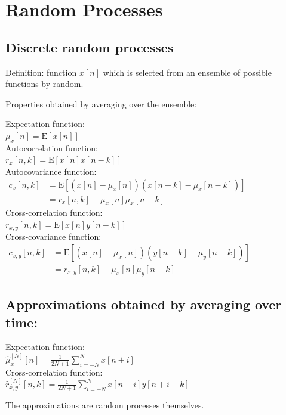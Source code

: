 \documentclass[english]{latex4ei/latex4ei_sheet}
\begin{document}
\section{Random Processes}
\begin{sectionbox}
  \subsection{Discrete random processes}
  Definition: function $x[n]$ which is selected from an ensemble of possible functions by random.
  
  Properties obtained by averaging over the ensemble:
  \begin{emphbox}
    Expectation function:\\
    $\mu_{x}[n]=\mathrm{E}[x[n]]$\\
    Autocorrelation function:\\
    $r_{x}[n, k]=\mathrm{E}[x[n] x[n-k]]$\\
    Autocovariance function:\\
    $\begin{aligned}
      c_{x}[n, k] &=\mathrm{E}\left[\left(x[n]-\mu_{x}[n]\right)\left(x[n-k]-\mu_{x}[n-k]\right)\right] \\
      &=r_{x}[n, k]-\mu_{x}[n] \mu_{x}[n-k]
      \end{aligned}$\\
    Cross-correlation function:\\
    $r_{x, y}[n, k]=\mathrm{E}[x[n] y[n-k]]$\\
    Cross-covariance function:\\
    $\begin{aligned}
      c_{x, y}[n, k] &=\mathrm{E}\left[\left(x[n]-\mu_{x}[n]\right)\left(y[n-k]-\mu_{y}[n-k]\right)\right] \\
      &=r_{x, y}[n, k]-\mu_{x}[n] \mu_{y}[n-k]
      \end{aligned}$\\
  \end{emphbox}
\end{sectionbox}
\begin{sectionbox}
  \subsection{Approximations obtained by averaging over time:}
  \begin{emphbox}
    Expectation function:\\
    $\hat{\mu}_{x}^{[N]}[n]=\frac{1}{2 N+1} \sum_{i=-N}^{N} x[n+i]$\\
    Cross-correlation function:\\
    $\hat{r}_{x, y}^{[N]}[n, k]=\frac{1}{2 N+1} \sum_{i=-N}^{N} x[n+i] y[n+i-k]$\\
  \end{emphbox}
  The approximations are random processes themselves.
\end{sectionbox}
\end{document}
